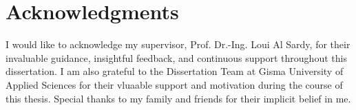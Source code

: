\chapter*{Acknowledgments}

I would like to acknowledge my supervisor, Prof. Dr.-Ing. Loui Al Sardy, for their invaluable guidance, insightful feedback, and continuous support throughout this dissertation. I am also grateful to the Dissertation Team at Gisma University of Applied Sciences for their vluaable support and motivation during the course of this thesis. Special thanks to my family and friends for their implicit belief in me.